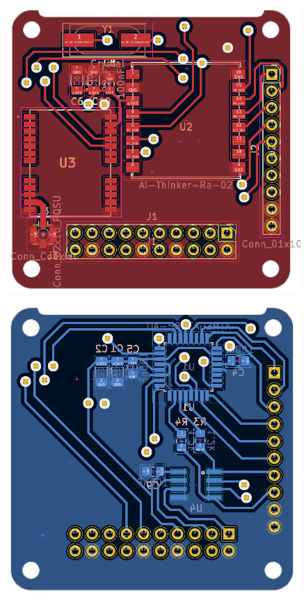 \graphicspath{{./figures}}

\begin{figure}[!htb]
  \centering
  \begin{minipage}{.46\textwidth}
    \centering
    \includegraphics[width=.95\linewidth]{pqunit_pcb_design_front}
    \label{fig:pqunit_pcb_design_front}
  \end{minipage}
  \begin{minipage}{.46\textwidth}
    \centering
    \includegraphics[width=.95\linewidth]{pqunit_pcb_design_back}
    \label{fig:pqunit_pcb_design_back}
  \end{minipage}
  \end{figure}


